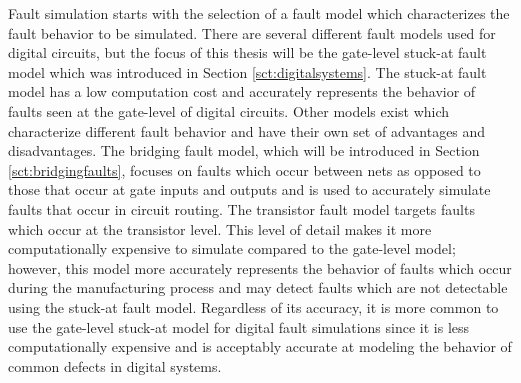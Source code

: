\documentclass[12pt]{report}
\begin{document}
Fault simulation starts with the selection of a fault model which characterizes the fault behavior to be simulated.  There are several different fault models used for digital circuits, but the focus of this thesis will be the gate-level stuck-at fault model which was introduced in Section \ref{sct:digitalsystems}.  The stuck-at fault model has a low computation cost and accurately represents the behavior of faults seen at the gate-level of digital circuits\cite{stroud}.  Other models exist which characterize different fault behavior and have their own set of advantages and disadvantages.  The bridging fault model, which will be introduced in Section \ref{sct:bridgingfaults}, focuses on faults which occur between nets as opposed to those that occur at gate inputs and outputs and is used to accurately simulate faults that occur in circuit routing\cite{stroud-bridging}.  The transistor fault model targets faults which occur at the transistor level.  This level of detail makes it more computationally expensive to simulate compared to the gate-level model; however, this model more accurately represents the behavior of faults which occur during the manufacturing process\cite{defectforcmos} and may detect faults which are not detectable using the stuck-at fault  model.  Regardless of its accuracy, it is more common to use the gate-level stuck-at model for digital fault simulations since it is less computationally expensive and is acceptably accurate at modeling the behavior of common defects in digital systems\cite{defectforcmos}.  
\end{document}
